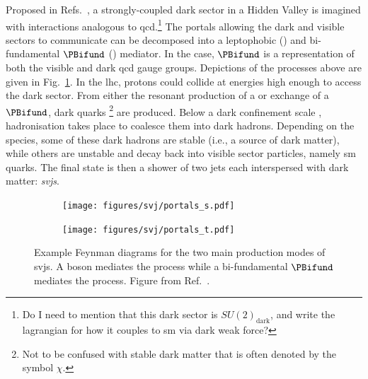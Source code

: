 Proposed in Refs.~, a strongly-coupled dark sector in a Hidden Valley is imagined with interactions analogous to \acrshort{qcd}.\footnote{Do I need to mention that this dark sector is $SU(2)_{\mathrm{dark}}$, and write the lagrangian for how it couples to \acrshort{sm} via dark weak force?} The portals allowing the dark and visible sectors to communicate can be decomposed into a leptophobic \PZprime (\schannel) and bi-fundamental $\PBifund$ (\tchannel) mediator. In the \tchannel case, $\PBifund$ is a representation of both the visible and dark \acrshort{qcd} gauge groups. Depictions of the processes above are given in Fig.~\ref{fig:theory_svj_portals}. In the \acrshort{lhc}, protons could collide at energies high enough to access the dark sector. From either the resonant production of a \PZprime or exchange of a $\PBifund$, dark quarks \Pqdark\footnote{Not to be confused with stable dark matter that is often denoted by the symbol $\chi$.} are produced. Below a dark confinement scale \lamDark, hadronisation takes place to coalesce them into dark hadrons. Depending on the species, some of these dark hadrons are stable (i.e., a source of dark matter), while others are unstable and decay back into visible sector particles, namely \acrlong{sm} quarks. The final state is then a shower of two \glspl{jet} each interspersed with dark matter: \emph{\glspl{svj}}.

\begin{figure}[htbp]
    \centering
    \begin{subfigure}[c]{0.32\textwidth}
    \centering
        \texttt{[image: figures/svj/portals\_s.pdf]}
        \caption{\schannel}
    \end{subfigure}
    \hspace{0.1\textwidth}
    \begin{subfigure}[c]{0.32\textwidth}
    \centering
        \texttt{[image: figures/svj/portals\_t.pdf]}
        \caption{\tchannel}
    \end{subfigure}
\caption[Example Feynman diagrams for the two main production modes of semi-visible jets. A \PZprime boson mediates the \schannel process while a bi-fundamental $\PBifund$ mediates the \tchannel process]{Example Feynman diagrams for the two main production modes of \glspl{svj}. A \PZprime boson mediates the \schannel process while a bi-fundamental $\PBifund$ mediates the \tchannel process. Figure from Ref.~.}
\label{fig:theory_svj_portals}
\end{figure}


